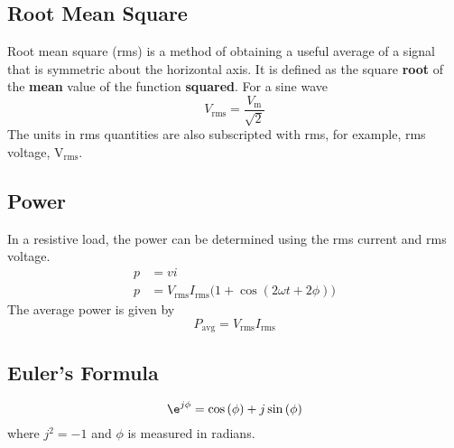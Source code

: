 \documentclass{article}
\begin{document}
\subsection{Root Mean Square}
\begin{definition}
    Root mean square (rms) is a method of obtaining a useful average of a signal that is symmetric about
    the horizontal axis. It is defined as the square \textbf{root} of the \textbf{mean} value of the
    function \textbf{squared}.
    For a sine wave
    \begin{equation*}
        V_{\mathrm{rms}} = \frac{V_{\mathrm{m}}}{\sqrt{2}}
    \end{equation*}
    The units in rms quantities are also subscripted with rms, for example, rms voltage, $\si{\volt}_{\mathrm{rms}}$.
\end{definition}
\subsection{Power}
\begin{definition}
    In a resistive load, the power can be determined using the rms current and rms voltage.
    \begin{align*}
        p & = vi                                                                                         \\
        p & = V_{\mathrm{rms}}I_{\mathrm{rms}}\bigl( 1 + \cos{\left( 2 \omega t + 2 \phi \right)} \bigr)
    \end{align*}
    The average power is given by
    \begin{equation*}
        P_{\mathrm{avg}} = V_{\mathrm{rms}}I_{\mathrm{rms}}
    \end{equation*}
\end{definition}
\subsection{Euler's Formula}
\begin{theorem}\label{theorem:eulers_formula}
    \begin{equation*}
        \e^{j\phi} = \cos{\left( \phi \right)} + j \sin{\left( \phi \right)}
    \end{equation*}
    where $j^2 = -1$ and $\phi$ is measured in radians.
\end{theorem}
\end{document}
